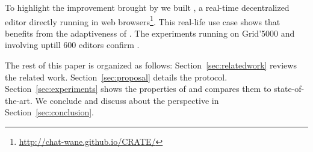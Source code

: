 To highlight the improvement brought by \SPRAY we built \CRATE, a real-time
decentralized editor directly running in web
browsers\footnote{\url{http://chat-wane.github.io/CRATE/}}. This real-life use
case shows that  benefits from the adaptiveness
of \SPRAY. The experiments running on Grid'5000 and involving uptill 600 editors
confirm .

The rest of this paper is organized as follows: Section~\ref{sec:relatedwork}
reviews the related work. Section~\ref{sec:proposal} details the \SPRAY
protocol. Section~\ref{sec:experiments} shows the properties of \SPRAY and
compares them to state-of-the-art. We conclude and discuss about the perspective
in Section~\ref{sec:conclusion}.

